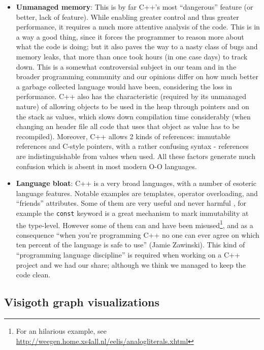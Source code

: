 \documentclass[a4paper,11pt,titlepage]{article}
\newcommand{\code}[1]{\texttt{#1}}
\begin{document}
\begin{itemize}

\item
  \textbf{Unmanaged memory}: This is by far C++'s most ``dangerous'' feature (or
  better, lack of feature). While enabling greater control and thus greater
  performance, it requires a much more attentive analysis of the code. This is
  in a way a good thing, since it forces the programmer to reason more about
  what the code is doing; but it also paves the way to a nasty class of bugs and
  memory leaks, that more than once took hours (in one case days) to track down.
  This is a somewhat controversial subject in our team and in the broader
  programming community and our opinions differ on how much better a garbage
  collected language would have been, considering the loss in performance. C++
  also has the characteristic (required by its unmanaged nature) of allowing
  objects to be used in the heap through pointers and on the stack as values,
  which slows down compilation time considerably (when changing an header file
  all code that uses that object as value has to be recompiled). Moreover, C++
  allows 2 kinds of references: immutable references and C-style pointers, with
  a rather confusing syntax - references are indistinguishable from values when
  used. All these factors generate much confusion which is absent in most modern
  O-O languages.

\item
  \textbf{Language bloat}: C++ is a very broad languages, with a number of
  esoteric language features. Notable examples are templates, operator
  overloading, and ``friends'' attributes. Some of them are very useful and
  never harmful , for example the \code{const} keyword is a great mechanism to
  mark immutability at the type-level. However some of them can and have been
  misused\footnote{For an hilarious example, see
    \url{http://weegen.home.xs4all.nl/eelis/analogliterals.xhtml}}, and as a
  consequence ``when you're programming C++ no one can ever agree on which ten
  percent of the language is safe to use'' (Jamie Zawinski). This kind of
  ``programming language discipline'' is required when working on a C++ project
  and we had our share; although we think we managed to keep the code clean.

\end{itemize}

\subsection{Visigoth graph visualizations}
\end{document}
